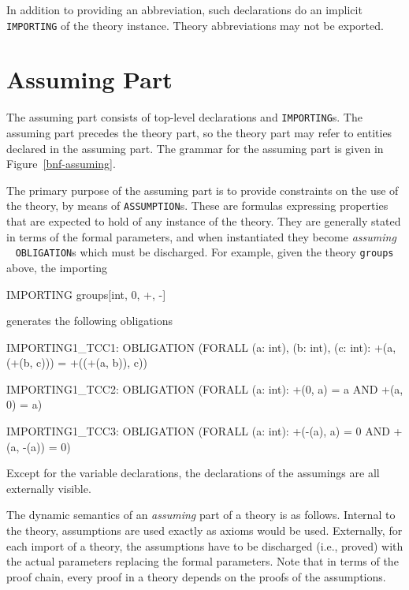 In addition to providing an abbreviation, such declarations do an
implicit {\tt IMPORTING} of the theory instance.
Theory abbreviations may not be exported.


\section{Assuming Part}\label{assuming}

The assuming part consists of top-level declarations and {\tt IMPORTING}s.
The assuming part precedes the theory part, so the
theory part may refer to entities declared in the assuming part.  The
grammar for the assuming part is given in Figure~\ref{bnf-assuming}.


The primary purpose of the assuming part is to provide constraints on the
use of the theory, by means of {\tt ASSUMPTION}s.  These are formulas
expressing properties that are expected to hold of any instance of the
theory.  They are generally stated in terms of the formal parameters, and
when instantiated they become \emph{assuming} \tccs\  {\tt OBLIGATION}s which must be discharged.  For
example, given the theory {\tt groups} above, the importing
\begin{pvsex}
  IMPORTING groups[int, 0, +, -]
\end{pvsex}
generates the following obligations
\begin{pvsex}
  IMPORTING1_TCC1: OBLIGATION
    (FORALL (a: int), (b: int), (c: int):
         +(a, (+(b, c))) = +((+(a, b)), c))
  
  IMPORTING1_TCC2: OBLIGATION (FORALL (a: int):
         +(0, a) = a AND +(a, 0) = a)
  
  IMPORTING1_TCC3: OBLIGATION (FORALL (a: int):
         +(-(a), a) = 0 AND +(a, -(a)) = 0)
\end{pvsex}

Except for the variable declarations, the declarations of the assumings
are all externally visible.  
  
The dynamic semantics of an \emph{assuming} part of a theory is as
follows.  Internal to the theory, assumptions are used exactly as axioms
would be used.  Externally, for each import of a theory, the assumptions
have to be discharged (i.e., proved) with the actual parameters replacing
the formal parameters.  Note that in terms of the proof chain, every proof
in a theory depends on the proofs of the assumptions.

